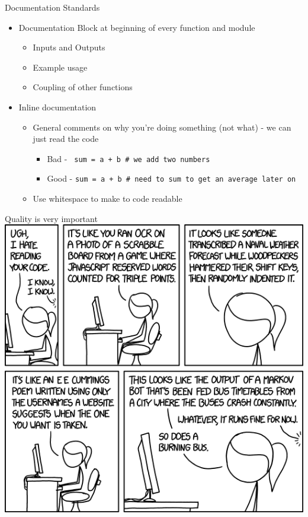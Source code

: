 \documentclass[11pt,professionalfonts]{beamer}
\begin{document}
\begin{frame}{Documentation Standards}
    \begin{itemize}
        \item Documentation Block at beginning of every function and module
            \begin{itemize}
                \item Inputs and Outputs
                \item Example usage
                \item Coupling of other functions
            \end{itemize}
        \item Inline documentation
            \begin{itemize}
                \item General comments on why you're doing something (not what) - we can just read the code
                    \begin{itemize}
                        \item Bad - \texttt{ sum = a + b \# we add two numbers}
                        \item Good - \texttt{sum = a + b \# need to sum to get an average later on}
                    \end{itemize}
                \item Use whitespace to make to code readable 
            \end{itemize}
    \end{itemize}
\end{frame}

\begin{frame}{Quality is very important}
    \centering
    \includegraphics[width=\textwidth,height=0.9\textheight,keepaspectratio]{figures/code_quality_2.png}
\end{frame}
\end{document}
